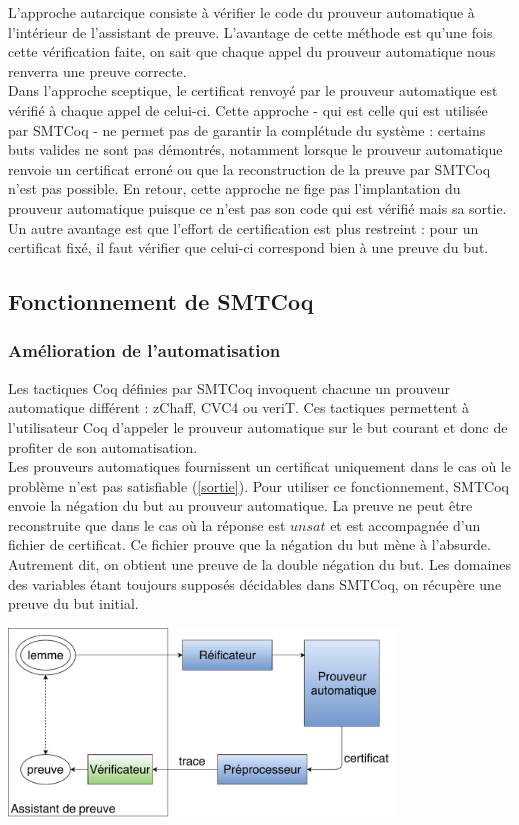 \documentclass[11pt]{article}
\begin{document}
L'approche autarcique consiste à vérifier le code du prouveur automatique à l'intérieur de l'assistant de preuve. L'avantage de cette méthode est qu'une fois cette vérification faite, on sait que chaque appel du prouveur automatique nous renverra une preuve correcte. \\

Dans l'approche sceptique, le certificat renvoyé par le prouveur automatique est vérifié à chaque appel de celui-ci. Cette approche - qui est celle qui est utilisée par SMTCoq - ne permet pas de garantir la complétude du système : certains buts valides ne sont pas démontrés, notamment lorsque le prouveur automatique renvoie un certificat erroné ou que la reconstruction de la preuve par SMTCoq n'est pas possible. En retour, cette approche ne fige pas l'implantation du prouveur automatique puisque ce n'est pas son code qui est vérifié mais sa sortie. Un autre avantage est que l'effort de certification est plus restreint : pour un certificat fixé, il faut vérifier que celui-ci correspond bien à une preuve du but.

\subsection{Fonctionnement de SMTCoq}

\subsubsection{Amélioration de l'automatisation}\label{negation}

Les tactiques Coq définies par SMTCoq invoquent chacune un prouveur automatique différent : zChaff, CVC4 ou veriT. Ces tactiques permettent à l'utilisateur Coq d'appeler le prouveur automatique sur le but courant et donc de profiter de son automatisation. \\

Les prouveurs automatiques fournissent un certificat uniquement dans le cas où le problème n'est pas satisfiable (\ref{sortie}). Pour utiliser ce fonctionnement, SMTCoq envoie la négation du but au prouveur automatique. La preuve ne peut être reconstruite que dans le cas où la réponse est $unsat$ et est accompagnée d'un fichier de certificat. Ce fichier prouve que la négation du but mène à l'absurde. Autrement dit, on obtient une preuve de la double négation du but. Les domaines des variables étant toujours supposés décidables dans SMTCoq, on récupère une preuve du but initial.

\begin{center}
    \includegraphics[height=5cm]{Automatisation.pdf}
\end{center}
\end{document}
